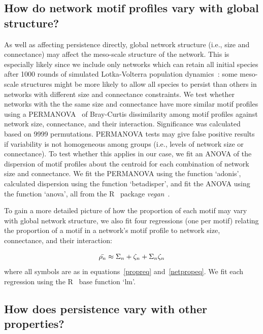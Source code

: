 \documentclass[12pt]{article}
\begin{document}
\begin{spacing}{2.0}
    \subsection{How do network motif profiles vary with global structure?}
    
        As well as affecting persistence directly, global network structure (i.e., size and connectance) may affect the meso-scale structure of the network.
        This is especially likely since we include only networks which can retain all initial species after 1000 rounds of simulated Lotka-Volterra population dynamics~\citep{Cirtwill2021_inprep}:  some meso-scale structures might be more likely to allow all species to persist than others in networks with different size and connectance constraints.
        We test whether networks with the the same size and connectance have more similar motif profiles using a PERMANOVA~\citep{Anderson2001} of Bray-Curtis dissimilarity among motif profiles against network size, connectance, and their interaction.
        Significance was calculated based on 9999 permutations.
        PERMANOVA tests may give false positive results if variability is not homogeneous among groups (i.e., levels of network size or connectance).
        To test whether this applies in our case, we fit an ANOVA of the dispersion of motif profiles about the centroid for each combination of network size and connectance. 
        We fit the PERMANOVA using the function `adonis', calculated dispersion using the function `betadisper', and fit the ANOVA using the function `anova', all from the R~\citep{R} package \emph{vegan}~\citep{vegan}.


        To gain a more detailed picture of how the proportion of each motif may vary with global network structure, we also fit four regressions (one per motif) relating the proportion of a motif in a network's motif profile to network size, connectance, and their interaction:

        \begin{equation}
            \Bar{\rho_{n}} \approx \Sigma_{n} + \zeta_{n} + \Sigma_{n}\zeta_{n}
        \end{equation}
        where all symbols are as in equations~\ref{propreq} and~\ref{netpropeq}.
        We fit each regression using the R~\citep{R} base function `lm'.
            

    \subsection{How does persistence vary with other properties?}


\end{spacing}
\end{document}
